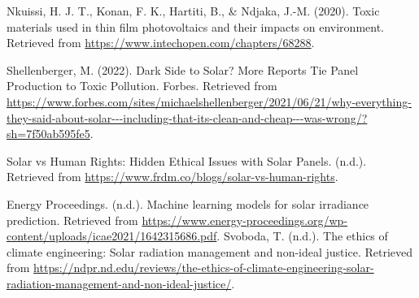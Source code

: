 \documentclass[10pt,twocolumn]{article}
\begin{document}
\begin{thebibliography}{200}
 Nkuissi, H. J. T., Konan, F. K., Hartiti, B., & Ndjaka, J.-M. (2020). Toxic materials used in thin film photovoltaics and their impacts on environment. Retrieved from \url{https://www.intechopen.com/chapters/68288}.

 Shellenberger, M. (2022). Dark Side to Solar? More Reports Tie Panel Production to Toxic Pollution. Forbes. Retrieved from \url{https://www.forbes.com/sites/michaelshellenberger/2021/06/21/why-everything-they-said-about-solar---including-that-its-clean-and-cheap---was-wrong/?sh=7f50ab595fe5}.

 Solar vs Human Rights: Hidden Ethical Issues with Solar Panels. (n.d.). Retrieved from \url{https://www.frdm.co/blogs/solar-vs-human-rights}.

 Energy Proceedings. (n.d.). Machine learning models for solar irradiance prediction. Retrieved from \url{https://www.energy-proceedings.org/wp-content/uploads/icae2021/1642315686.pdf}.
 Svoboda, T. (n.d.). The ethics of climate engineering: Solar radiation management and non-ideal justice. Retrieved from \url{https://ndpr.nd.edu/reviews/the-ethics-of-climate-engineering-solar-radiation-management-and-non-ideal-justice/}.

\end{thebibliography}





\printbibliography
\end{document}
